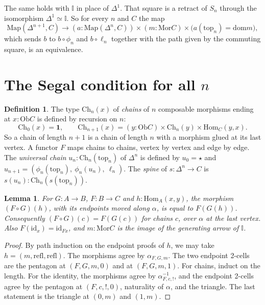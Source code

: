 \documentclass[11pt]{amsart}
\numberwithin{equation}{section}
\newtheorem{lemma}[theorem]{Lemma}
\theoremstyle{definition}
\newtheorem{definition}[theorem]{Definition}
\theoremstyle{remark}
\newcommand{\Map}{\mathrm{Map}}
\newcommand{\Ob}{\mathrm{Ob}}
\newcommand{\Mor}{\mathrm{Mor}}
\newcommand{\Hom}{\mathrm{Hom}}
\newcommand{\Ch}{\mathrm{Ch}}
\newcommand{\dom}{\mathrm{dom}}
\newcommand{\id}{\mathrm{id}}
\newcommand{\II}{\mathbb{I}}
\newcommand{\one}{\mathbf{1}}
\begin{document}
The same holds with $\II$ in place of $\Delta^1$. That square is a
retract of $S_n$ through the isomorphism $\Delta^1\simeq\II$. So for
every $n$ and $C$ the map
\begin{equation}\label{eq:pushout}
\Map(\Delta^{n+1},C)\to(a:\Map(\Delta^n,C))\times(m:\Mor C)\times
\bigl(a(\mathrm{top}_n)=\dom m\bigr),
\end{equation}
which sends $b$ to $b\circ\phi_n$ and $b\circ\ell_n$ together with the
path given by the commuting square, is an equivalence.

\section{The Segal condition for all $n$}\label{sec:segal}

\begin{definition}
The type $\Ch_n(x)$ of \emph{chains} of $n$ composable morphisms ending
at $x:\Ob C$ is defined by recursion on $n$:
\[
\Ch_0(x)=\one,\qquad
\Ch_{n+1}(x)=(y:\Ob C)\times\Ch_n(y)\times\Hom_C(y,x).
\]
So a chain of length $n+1$ is a chain of length $n$ with a morphism
glued at its last vertex. A functor $F$ maps chains to chains, vertex
by vertex and edge by edge. The \emph{universal chain}
$u_n:\Ch_n(\mathrm{top}_n)$ of $\Delta^n$ is defined by $u_0=\star$
and $u_{n+1}=(\phi_n(\mathrm{top}_n),\ \phi_n(u_n),\ \ell_n)$. The
\emph{spine} of $s:\Delta^n\to C$ is $s(u_n):\Ch_n(s(\mathrm{top}_n))$.
\end{definition}

\begin{lemma}\label{lem:homfunct}
For $G:A\to B$, $F:B\to C$ and $h:\Hom_A(x,y)$, the morphism
$(F\circ G)(h)$, with its endpoints moved along $\alpha$, is equal to
$F(G(h))$. Consequently $(F\circ G)(c)=F(G(c))$ for chains $c$, over
$\alpha$ at the last vertex. Also $F(\id_x)=\id_{Fx}$, and
$m:\Mor C$ is the image of the generating arrow of $\II$.
\end{lemma}

\begin{proof}
By path induction on the endpoint proofs of $h$, we may take
$h=(m,\mathrm{refl},\mathrm{refl})$. The morphisms agree by
$\alpha_{F,G,m}$. The two endpoint 2-cells are the pentagon at
$(F,G,m,0)$ and at $(F,G,m,1)$. For chains, induct on the length. For
the identity, the morphisms agree by $\alpha_{F,c,!}^{-1}$, and the
endpoint 2-cells agree by the pentagon at $(F,c,!,0)$, naturality of
$\alpha$, and the triangle. The last statement is the triangle at
$(0,m)$ and $(1,m)$.
\end{proof}
\end{document}
